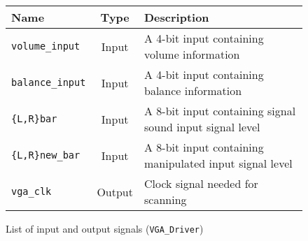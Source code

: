 \begin{figure}[h]
  \centering
  \caption{List of input and output signals (\texttt{VGA\_Driver})}
  \label{tab:vgaio}
    \begin{tabular}{|l|c|l|}
      \hline
      Name & Type & Description \\
      \hline
      \verb+volume_input+ & Input & A 4-bit input containing volume information\\
      \hline
      \verb+balance_input+ & Input & A 4-bit input containing balance information\\
      \hline
      \verb+{L,R}bar+ & Input & A 8-bit input containing signal sound input signal level\\
      \hline
      \verb+{L,R}new_bar+ & Input & A 8-bit input containing manipulated input signal level\\
      \hline
   	\verb+vga_clk+ & Output & Clock signal needed for scanning\\
      \hline
    \end{tabular}
\end{figure}


 

